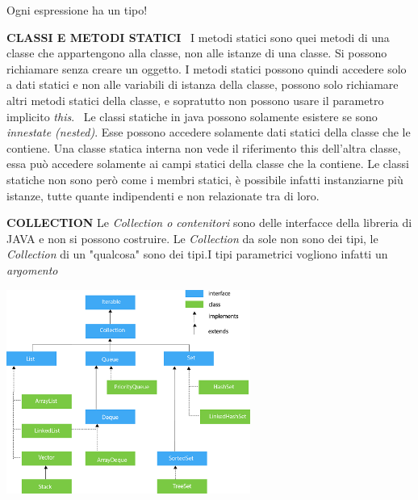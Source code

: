 \noindent Ogni espressione ha un tipo!

\noindent \textbf{CLASSI E METODI STATICI} \newline
\textbullet\ I metodi statici sono quei metodi di una classe che appartengono alla classe, non alle istanze di una classe. Si possono richiamare senza creare un oggetto. I metodi statici possono quindi accedere solo a dati statici e non alle variabili di istanza della classe, possono solo richiamare altri metodi statici della classe, e sopratutto non possono usare il parametro implicito \textit{this}. \newline
\textbullet\ Le classi statiche in java possono solamente esistere se sono \textit{innestate (nested)}. Esse possono accedere solamente dati statici della classe che le contiene. Una classe statica interna non vede il riferimento this dell'altra classe, essa può accedere solamente ai campi statici della classe che la contiene.\newline
Le classi statiche non sono però come i membri statici, è possibile infatti instanziarne più istanze, tutte quante indipendenti e non relazionate tra di loro. 

\noindent \textbf{COLLECTION} \newline
Le \textit{Collection o contenitori} sono delle interfacce della libreria di JAVA e non si possono costruire.\newline
Le \textit{Collection} da sole non sono dei tipi, le \textit{Collection} di un "qualcosa" sono dei tipi.I tipi parametrici vogliono infatti un \textit{argomento} \newline
\begin{center}
\includegraphics[width=%
0.6\textwidth]{java-collection-hierarchy}
\end{center} 

